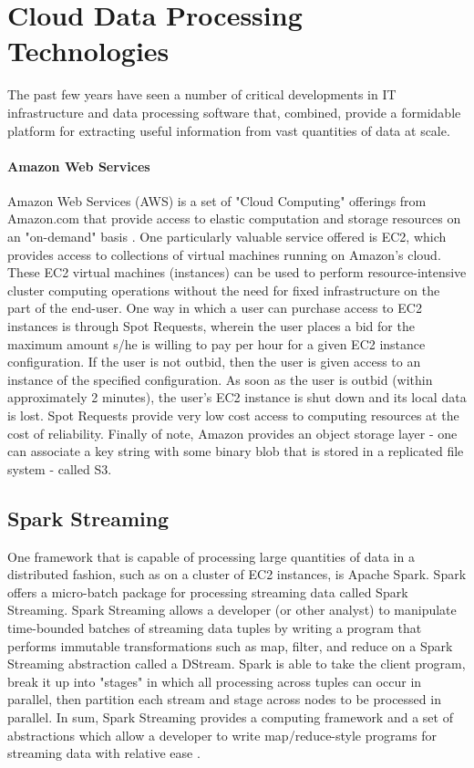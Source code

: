 \documentclass{thesis}
\begin{document}
    \section{Cloud Data Processing Technologies}
        The past few years have seen a number of critical developments in IT
        infrastructure and data processing software that, combined, provide
        a formidable platform for extracting useful information from vast
        quantities of data at scale.
        \paragraph{Amazon Web Services}
            Amazon Web Services (AWS) is a set of "Cloud Computing" offerings
            from Amazon.com that provide access to elastic computation and storage
            resources on an "on-demand" basis \cite{aws}. One particularly valuable
            service offered is EC2, which provides access to collections of virtual
            machines running on Amazon's cloud. These EC2 virtual machines (instances)
            can be used to perform resource-intensive cluster computing operations without
            the need for fixed infrastructure on the part of the end-user. One way in which
            a user can purchase access to EC2 instances is through Spot Requests, wherein the
            user places a bid for the maximum amount s/he is willing to pay per hour for a given
            EC2 instance configuration. If the user is not outbid, then the user is given access
            to an instance of the specified configuration. As soon as the user is outbid (within
            approximately 2 minutes), the user's EC2 instance is shut down and its local data is
            lost. Spot Requests provide very low cost access to computing resources at the cost of
            reliability.%
            Finally of note, Amazon provides an object storage layer - one can associate a key string
            with some binary blob that is stored in a replicated file system - called S3.
    \subsection{Spark Streaming}
        One framework that is capable of processing large quantities of data in a distributed fashion,
        such as on a cluster of EC2 instances, is Apache Spark. Spark offers a micro-batch package for
        processing streaming data called Spark Streaming. Spark Streaming allows a developer (or other
        analyst) to manipulate time-bounded batches of streaming data tuples by writing a program that
        performs immutable transformations such as map, filter, and reduce on a Spark Streaming abstraction
        called a DStream. Spark is able to take the client program, break it up into "stages" in which
        all processing across tuples can occur in parallel, then partition each stream and stage
        across nodes to be processed in parallel. %
        In sum, Spark Streaming provides a computing framework and a set of abstractions which allow
        a developer to write map/reduce-style programs for streaming data with relative ease
        \cite{spark:streaming}.
\end{document}
